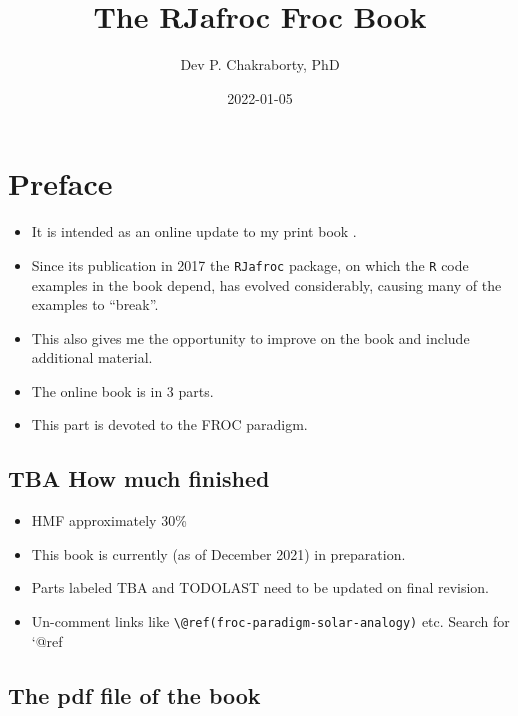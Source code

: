 \documentclass[
]{book}
\title{The RJafroc Froc Book}
\author{Dev P. Chakraborty, PhD}
\date{2022-01-05}
\providecommand{\tightlist}{%
  \setlength{\itemsep}{0pt}\setlength{\parskip}{0pt}}
\begin{document}
\maketitle

{
\setcounter{tocdepth}{1}
\tableofcontents
}
\hypertarget{preface}{%
\chapter*{Preface}\label{preface}}

\begin{itemize}
\tightlist
\item
  It is intended as an online update to my print book \citep{chakraborty2017observer}.
\item
  Since its publication in 2017 the \texttt{RJafroc} package, on which the \texttt{R} code examples in the book depend, has evolved considerably, causing many of the examples to ``break''.
\item
  This also gives me the opportunity to improve on the book and include additional material.
\item
  The online book is in 3 parts.
\item
  This part is devoted to the FROC paradigm.
\end{itemize}

\hypertarget{tba-how-much-finished}{%
\section*{TBA How much finished}\label{tba-how-much-finished}}

\begin{itemize}
\tightlist
\item
  HMF approximately 30\%
\item
  This book is currently (as of December 2021) in preparation.
\item
  Parts labeled TBA and TODOLAST need to be updated on final revision.
\item
  Un-comment links like \texttt{\textbackslash{}@ref(froc-paradigm-solar-analogy)} etc. Search for `@ref
\end{itemize}

\hypertarget{the-pdf-file-of-the-book}{%
\section*{The pdf file of the book}\label{the-pdf-file-of-the-book}}
\end{document}
